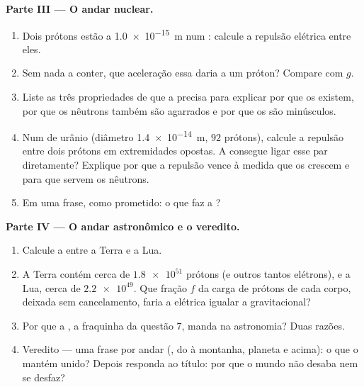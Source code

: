 \begin{problem}
\medskip
\noindent\textbf{Parte III --- O andar nuclear.}
\begin{enumerate}[resume]
  \item Dois prótons estão a \qty{1.0e-15}{m} num : calcule a
        repulsão elétrica entre eles.
  \item Sem nada a conter, que aceleração essa  daria a um próton?
        Compare com $g$.
  \item Liste as três propriedades de que a  precisa para
        explicar por que os  existem, por que os nêutrons também
        são agarrados e por que os  são minúsculos.
  \item Num  de urânio (diâmetro \qty{1.4e-14}{m}, $92$ prótons),
        calcule a repulsão entre dois prótons em extremidades opostas. A
         consegue ligar esse par diretamente? Explique por
        que a repulsão vence à medida que os  crescem e para que
        servem os nêutrons.
  \item Em uma frase, como prometido: o que faz a ?
\end{enumerate}

\medskip
\noindent\textbf{Parte IV --- O andar astronômico e o veredito.}
\begin{enumerate}[resume]
  \item Calcule a  entre a Terra e a Lua.
  \item A Terra contém cerca de $\num{1.8e51}$ prótons (e outros tantos
        elétrons), e a Lua, cerca de $\num{2.2e49}$. Que fração $f$ da
        carga de prótons de cada corpo, deixada sem cancelamento, faria a
         elétrica igualar a gravitacional?
  \item Por que a , a fraquinha da questão 7, manda na
        astronomia? Duas razões.
  \item Veredito --- uma frase por andar (, do  à montanha,
        planeta e acima): o que o mantém unido? Depois responda ao
        título: por que o mundo não desaba nem se desfaz?
\end{enumerate}
\end{problem}
